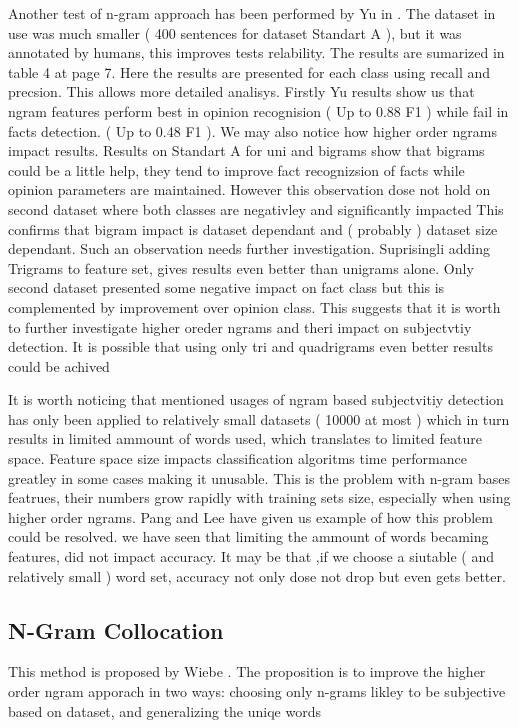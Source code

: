 Another test of n-gram approach has been performed by Yu in \cite{Yu2003}. The dataset in use was much smaller ( 400 sentences for dataset Standart A ),
but it was annotated by humans, this improves tests relability. The results are sumarized in table 4 at page 7. Here the results are presented
for each class using recall and precsion. This allows more detailed analisys. Firstly Yu results show us that ngram features perform best in opinion
recognision ( Up to 0.88 F1 ) while fail in facts detection. ( Up to 0.48 F1 ).  We may also notice how higher order ngrams impact results. Results on 
Standart A for uni and bigrams show that bigrams could be a little help, they tend to improve fact recognizsion of facts while opinion
 parameters are maintained. However this observation dose not hold on second dataset where both classes are negativley and significantly impacted
This confirms that bigram impact is dataset dependant and ( probably ) dataset size dependant. Such an observation needs further investigation.
Suprisingli adding Trigrams to feature set, gives results even better than unigrams alone. Only second dataset presented some negative impact on fact 
class but this is complemented by improvement over opinion class. This suggests that it is worth to further investigate higher oreder ngrams and theri
impact on subjectvtiy detection. It is possible that using only tri and quadrigrams even better results could be achived

It is worth noticing that mentioned usages of ngram based subjectvitiy detection has only been applied to relatively small datasets ( 10000 at most )
which in turn results in limited ammount of words used, which translates to limited feature space.  Feature space size impacts classification algoritms
time performance greatley in some cases making it unusable. This is the problem with n-gram bases featrues, their numbers grow rapidly with training sets
size, especially when using higher order ngrams.  Pang and Lee \cite{PangLee2002} have given us example of how this problem could be resolved.
we have seen that limiting the ammount of words becaming features, did not impact accuracy. It may be that ,if we choose a siutable ( and relatively small )
word set, accuracy not only dose not drop but even gets better.

\subsection{ N-Gram Collocation }

This method is proposed by Wiebe \cite{Wiebe2001}. The proposition is to improve the higher order ngram apporach in two ways: choosing only n-grams
likley to be subjective based on dataset, and generalizing the uniqe words

